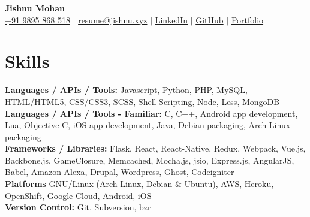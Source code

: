 \documentclass[letterpaper,11pt]{article}
\newcommand{\resumeSubHeadingListStart}{\begin{itemize}[leftmargin=0.15in, label={}]}
\newcommand{\resumeSubHeadingListEnd}{\end{itemize}}
\begin{document}

\begin{center}
    \textbf{\Huge \sffamily\mdseries\upshape Jishnu Mohan} \\ \vspace{3pt}
    \small
    \faMobile \hspace{.5pt} \href{tel:9895868518}{+91 9895 868 518}
    $|$
    \faAt \hspace{.5pt} \href{mailto:resume@jishnu.xyz}{resume@jishnu.xyz}
    $|$
    \faLinkedinSquare \hspace{.5pt} \href{https://www.linkedin.com/in/jishnu7}{LinkedIn}
    $|$
    \faGithub \hspace{.5pt} \href{https://github.com/jishnu7}{GitHub}
    $|$
    \faGlobe \hspace{.5pt} \href{https://j15h.nu}{Portfolio}
\end{center}




\section{Skills}
  \vspace{2pt}
  \resumeSubHeadingListStart
    \small{\item{
        \textbf{Languages / APIs / Tools:}{ Javascript, Python, PHP, MySQL, HTML/HTML5, CSS/CSS3, SCSS, Shell Scripting, Node, Less, MongoDB} \\ \vspace{3pt}
        \textbf{Languages / APIs / Tools - Familiar:}{ C, C++, Android app development, Lua, Objective C, iOS app development, Java, Debian packaging, Arch Linux packaging} \\ \vspace{3pt}
        \textbf{Frameworks / Libraries:}{ Flask, React, React-Native, Redux, Webpack, Vue.js, Backbone.js, GameClosure, Memcached, Mocha.js, jsio, Express.js, AngularJS, Babel, Amazon Alexa, Drupal, Wordpress, Ghost, Codeigniter} \\ \vspace{3pt}
        \textbf{Platforms}{ GNU/Linux (Arch Linux, Debian \& Ubuntu), AWS, Heroku, OpenShift, Google Cloud, Android, iOS} \\ \vspace{3pt}
        \textbf{Version Control:}{ Git, Subversion, bzr}
    }}
  \resumeSubHeadingListEnd
\end{document}

